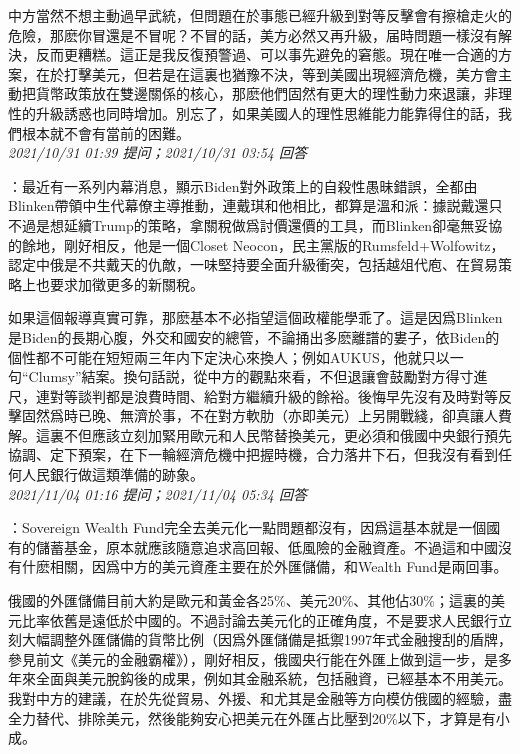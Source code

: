 \documentclass[twocolumn]{ctexart}
\begin{document}
中方當然不想主動過早武統，但問題在於事態已經升級到對等反擊會有擦槍走火的危險，那麽你冒還是不冒呢？不冒的話，美方必然又再升級，届時問題一樣沒有解決，反而更糟糕。這正是我反復預警過、可以事先避免的窘態。現在唯一合適的方案，在於打擊美元，但若是在這裏也猶豫不決，等到美國出現經濟危機，美方會主動把貨幣政策放在雙邊關係的核心，那麽他們固然有更大的理性動力來退讓，非理性的升級誘惑也同時增加。別忘了，如果美國人的理性思維能力能靠得住的話，我們根本就不會有當前的困難。
\\

\textit{\hfill\noindent\small 2021/10/31 01:39 提问；2021/10/31 03:54 回答}

：最近有一系列内幕消息，顯示Biden對外政策上的自殺性愚昧錯誤，全都由Blinken帶領中生代幕僚主導推動，連戴琪和他相比，都算是溫和派：據説戴還只不過是想延續Trump的策略，拿關稅做爲討價還價的工具，而Blinken卻毫無妥協的餘地，剛好相反，他是一個Closet Neocon，民主黨版的Rumsfeld+Wolfowitz，認定中俄是不共戴天的仇敵，一味堅持要全面升級衝突，包括越俎代庖、在貿易策略上也要求加徵更多的新關稅。

如果這個報導真實可靠，那麽基本不必指望這個政權能學乖了。這是因爲Blinken是Biden的長期心腹，外交和國安的總管，不論捅出多麽離譜的婁子，依Biden的個性都不可能在短短兩三年内下定決心來換人；例如AUKUS，他就只以一句“Clumsy”結案。換句話説，從中方的觀點來看，不但退讓會鼓勵對方得寸進尺，連對等談判都是浪費時間、給對方繼續升級的餘裕。後悔早先沒有及時對等反擊固然爲時已晚、無濟於事，不在對方軟肋（亦即美元）上另開戰綫，卻真讓人費解。這裏不但應該立刻加緊用歐元和人民幣替換美元，更必須和俄國中央銀行預先協調、定下預案，在下一輪經濟危機中把握時機，合力落井下石，但我沒有看到任何人民銀行做這類準備的跡象。
\\

\textit{\hfill\noindent\small 2021/11/04 01:16 提问；2021/11/04 05:34 回答}

：Sovereign Wealth Fund完全去美元化一點問題都沒有，因爲這基本就是一個國有的儲蓄基金，原本就應該隨意追求高回報、低風險的金融資產。不過這和中國沒有什麽相關，因爲中方的美元資產主要在於外匯儲備，和Wealth Fund是兩回事。

俄國的外匯儲備目前大約是歐元和黃金各25\%、美元20\%、其他佔30\%；這裏的美元比率依舊是遠低於中國的。不過討論去美元化的正確角度，不是要求人民銀行立刻大幅調整外匯儲備的貨幣比例（因爲外匯儲備是抵禦1997年式金融搜刮的盾牌，參見前文《美元的金融霸權》），剛好相反，俄國央行能在外匯上做到這一步，是多年來全面與美元脫鈎後的成果，例如其金融系統，包括融資，已經基本不用美元。我對中方的建議，在於先從貿易、外援、和尤其是金融等方向模仿俄國的經驗，盡全力替代、排除美元，然後能夠安心把美元在外匯占比壓到20\%以下，才算是有小成。
\end{document}
